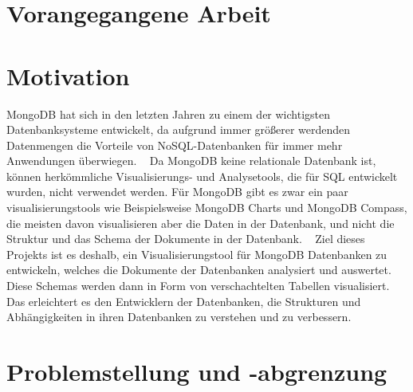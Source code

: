 \iffalse
Die Einleitung dient dazu, beim Leser Interesse für die Inhalte 
Praxissemesterberichts zu wecken, die behandelten Probleme aufzuzeigen 
und die zu ihrer Lösung entwickelten Konzepte zu beschreiben.
\fi



\section{Vorangegangene Arbeit}
\label{sec:vorangegangene_arbeit}

\section{Motivation}
\label{sec:motivation}

\iffalse
In der Motivation wird dargestellt, welche Bedeutung die im 
Praxissemester zu entwickelnden Lösungen für das betreuende Unternehmen 
haben. Es wird beispielsweise aufzeigt, in welches Produkt sie eingehen, 
welcher Ablauf verbessert werden soll etc.
\fi

MongoDB hat sich in den letzten Jahren zu einem der wichtigsten Datenbanksysteme entwickelt, da aufgrund immer größerer werdenden Datenmengen die Vorteile von NoSQL-Datenbanken für immer mehr Anwendungen überwiegen.
~\autocite{db-engines:mongodb}
Da MongoDB keine relationale Datenbank ist, können herkömmliche Visualisierungs- und Analysetools, die für SQL entwickelt wurden, nicht verwendet werden.
Für MongoDB gibt es zwar ein paar visualisierungstools wie Beispielsweise MongoDB Charts und MongoDB Compass, die meisten davon visualisieren aber die Daten in der Datenbank, und nicht die Struktur und das Schema der Dokumente in der Datenbank.
~\autocite{knowi:mongo_vis_tools}
Ziel dieses Projekts ist es deshalb, ein Visualisierungstool für MongoDB Datenbanken zu entwickeln, welches die Dokumente der Datenbanken analysiert und auswertet.
Diese Schemas werden dann in Form von verschachtelten Tabellen visualisiert.
Das erleichtert es den Entwicklern der Datenbanken, die Strukturen und Abhängigkeiten in ihren Datenbanken zu verstehen und zu verbessern.


\section{Problemstellung und -abgrenzung}
\label{sec:problemstellung}

